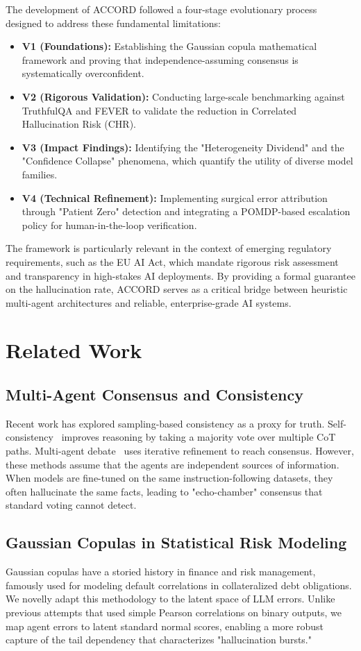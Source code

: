 \documentclass[conference]{IEEEtran}
\begin{document}
The development of ACCORD followed a four-stage evolutionary process designed to address these fundamental limitations:
\begin{itemize}
    \item \textbf{V1 (Foundations):} Establishing the Gaussian copula mathematical framework and proving that independence-assuming consensus is systematically overconfident.
    \item \textbf{V2 (Rigorous Validation):} Conducting large-scale benchmarking against TruthfulQA and FEVER to validate the reduction in Correlated Hallucination Risk (CHR).
    \item \textbf{V3 (Impact Findings):} Identifying the "Heterogeneity Dividend" and the "Confidence Collapse" phenomena, which quantify the utility of diverse model families.
    \item \textbf{V4 (Technical Refinement):} Implementing surgical error attribution through "Patient Zero" detection and integrating a POMDP-based escalation policy for human-in-the-loop verification.
\end{itemize}

The framework is particularly relevant in the context of emerging regulatory requirements, such as the EU AI Act, which mandate rigorous risk assessment and transparency in high-stakes AI deployments. By providing a formal guarantee on the hallucination rate, ACCORD serves as a critical bridge between heuristic multi-agent architectures and reliable, enterprise-grade AI systems.

\section{Related Work}

\subsection{Multi-Agent Consensus and Consistency}
Recent work has explored sampling-based consistency as a proxy for truth. Self-consistency~\cite{b3} improves reasoning by taking a majority vote over multiple CoT paths. Multi-agent debate~\cite{b2} uses iterative refinement to reach consensus. However, these methods assume that the agents are independent sources of information. When models are fine-tuned on the same instruction-following datasets, they often hallucinate the same facts, leading to "echo-chamber" consensus that standard voting cannot detect.

\subsection{Gaussian Copulas in Statistical Risk Modeling}
Gaussian copulas have a storied history in finance and risk management, famously used for modeling default correlations in collateralized debt obligations. We novelly adapt this methodology to the latent space of LLM errors. Unlike previous attempts that used simple Pearson correlations on binary outputs, we map agent errors to latent standard normal scores, enabling a more robust capture of the tail dependency that characterizes "hallucination bursts."
\end{document}
